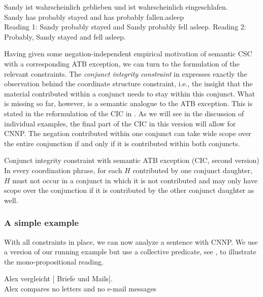 \documentclass[output=paper]{langsci/langscibook}
\begin{document}
\ea \label{stay-asleep-ATB}
\gll Sandy ist wahrscheinlich geblieben und ist wahrscheinlich eingeschlafen.\\
Sandy has probably stayed and has probably fallen.asleep\\
\glt {}
\glt Reading 1: Sandy probably stayed and Sandy probably fell asleep.
\glt Reading 2: Probably, Sandy stayed and fell asleep.
\z 

Having given some negation-independent empirical motivation of semantic CSC with a corresponding ATB exception, we can turn to the formulation of the relevant constraints.
The \emph{conjunct integrity constraint} in 
expresses exactly the observation behind the coordinate structure constraint, i.e., the insight that the material contributed within a conjunct needs to stay within this conjunct. 
What is missing so far, however, is a semantic analogue to the ATB exception. %
This is stated in the reformulation of the CIC in .
As we will see in the discussion of individual examples, the final part of the CIC in this version will allow for CNNP. The negation contributed within one conjunct can take wide scope over the entire conjunction if and only if it is contributed within both conjuncts.


\ea 
Conjunct integrity constraint with semantic ATB exception (CIC, second version)\label{SemATB}\\

In every coordination phrase, 
for each $H$ contributed by one conjunct daughter, $H$ must not occur in a conjunct in which it is not contributed and may only have scope over the conjunction if 
it is contributed by the other conjunct daughter as well.

\z 

\subsubsection{A simple example}\label{Sec-AnalyisSimpleExample}\largerpage

With all constraints in place, we can now analyze a sentence with CNNP. We use a version of our running example but use a collective predicate, see , to illustrate the mono-propositional reading.

\ea \label{ex-brief-mail-ana}
\gll Alex vergleicht [{} Briefe und {} Mails].\\
Alex compares {\hphantom{[}no} letters and no {e-mail messages}\\
\z 
\end{document}
